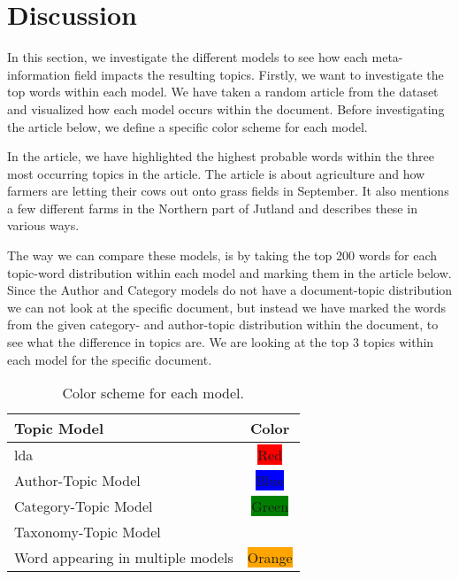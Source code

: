 \section{Discussion}\label{sec:discussion}
In this section, we investigate the different models to see how each meta-information field impacts the resulting topics.
Firstly, we want to investigate the top words within each model.
We have taken a random article from the dataset and visualized how each model occurs within the document. 
Before investigating the article below, we define a specific color scheme for each model.

In the article, we have highlighted the highest probable words within the three most occurring topics in the article.
The article is about agriculture and how farmers are letting their cows out onto grass fields in September. 
It also mentions a few different farms in the Northern part of Jutland and describes these in various ways.

The way we can compare these models, is by taking the top 200 words for each topic-word distribution within each model and marking them in the article below.
Since the Author and Category models do not have a document-topic distribution we can not look at the specific document, but instead we have marked the words from the given category- and author-topic distribution within the document, to see what the difference in topics are.
We are looking at the top 3 topics within each model for the specific document.


\begin{table}[h]
	\centering
	\caption{Color scheme for each model.}
	\begin{tabular}{l|c}
		Topic Model & Color \\
		\midrule
		\Acrlong{lda} & \colorbox{red}{Red} \\
		Author-Topic Model & \colorbox{blue}{Blue} \\
		Category-Topic Model & \colorbox{green}{Green} \\
		Taxonomy-Topic Model & \\
		Word appearing in multiple models & \colorbox{orange}{Orange}  \\
	\end{tabular}
	\label{tab:disc_color}
\end{table}

